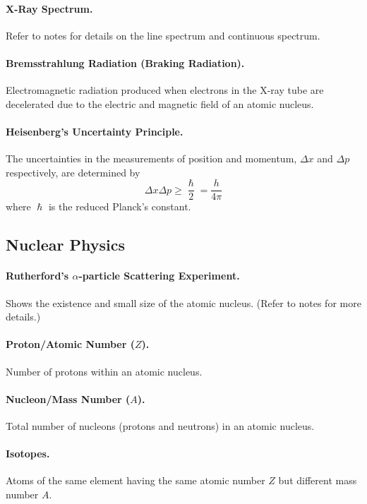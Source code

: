 \documentclass{article}
\begin{document}
\paragraph{X-Ray Spectrum.} Refer to notes for details on the line spectrum and continuous spectrum.

\paragraph{Bremsstrahlung Radiation (Braking Radiation).} Electromagnetic radiation produced when electrons in the X-ray tube are decelerated due to the electric and magnetic field of an atomic nucleus.

\paragraph{Heisenberg's Uncertainty Principle.} The uncertainties in the measurements of position and momentum, $\Delta x$ and $\Delta p$ respectively, are determined by \begin{equation}
\Delta x \Delta p \geq \frac{\hslash}{2} = \frac{h}{4\pi}
\end{equation} where $\hslash$ is the reduced Planck's constant.

\subsection{Nuclear Physics}

\paragraph{Rutherford's $\alpha$-particle Scattering Experiment.} Shows the existence and small size of the atomic nucleus. (Refer to notes for more details.)

\paragraph{Proton/Atomic Number ($Z$).} Number of protons within an atomic nucleus.

\paragraph{Nucleon/Mass Number ($A$).} Total number of nucleons (protons and neutrons) in an atomic nucleus.

\paragraph{Isotopes.} Atoms of the same element having the same atomic number $Z$ but different mass number $A$.
\end{document}
